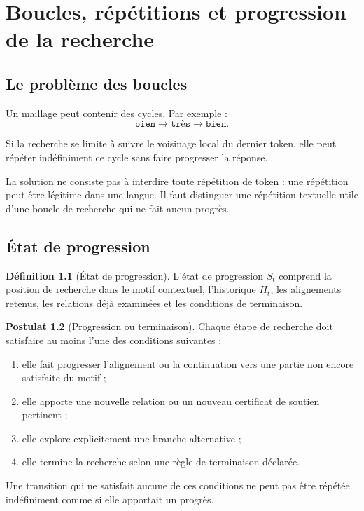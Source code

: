 \documentclass[11pt,a4paper]{report}
\theoremstyle{definition}
\newtheorem{definition}{Définition}[chapter]
\newtheorem{postulat}[definition]{Postulat}
\theoremstyle{plain}
\theoremstyle{remark}
\begin{document}
\chapter{Boucles, répétitions et progression de la recherche}

\section{Le problème des boucles}

Un maillage peut contenir des cycles. Par exemple :
\[
\texttt{bien}\to\texttt{très}\to\texttt{bien}.
\]

Si la recherche se limite à suivre le voisinage local du dernier
token, elle peut répéter indéfiniment ce cycle sans faire
progresser la réponse.

La solution ne consiste pas à interdire toute répétition de
token : une répétition peut être légitime dans une langue.
Il faut distinguer une répétition textuelle utile d'une boucle
de recherche qui ne fait aucun progrès.

\section{État de progression}

\begin{definition}[État de progression]
L'état de progression \(S_t\) comprend la position de recherche
dans le motif contextuel, l'historique \(H_t\), les alignements
retenus, les relations déjà examinées et les conditions de
terminaison.
\end{definition}

\begin{postulat}[Progression ou terminaison]
Chaque étape de recherche doit satisfaire au moins l'une des
conditions suivantes :
\begin{enumerate}[label=\alph*)]
  \item elle fait progresser l'alignement ou la continuation
        vers une partie non encore satisfaite du motif ;
  \item elle apporte une nouvelle relation ou un nouveau
        certificat de soutien pertinent ;
  \item elle explore explicitement une branche alternative ;
  \item elle termine la recherche selon une règle de terminaison
        déclarée.
\end{enumerate}
Une transition qui ne satisfait aucune de ces conditions ne
peut pas être répétée indéfiniment comme si elle apportait un
progrès.
\end{postulat}
\end{document}
